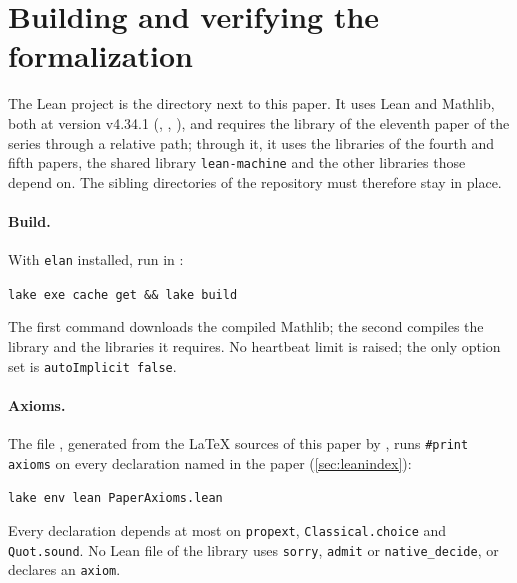 \section{Building and verifying the formalization}\label{sec:verify}

The Lean project is the directory  next to this paper. It uses Lean and Mathlib, both at version v4.34.1
(, , ), and requires the library of the eleventh paper of
the series through a relative path; through it, it uses the libraries of the fourth and fifth papers, the shared
library \texttt{lean-machine} and the other libraries those depend on. The sibling directories of the repository must
therefore stay in place.

\paragraph{Build.} With \texttt{elan} installed, run in :
\begin{center}
\texttt{lake exe cache get \&\& lake build}
\end{center}
The first command downloads the compiled Mathlib; the second compiles the library and the libraries it requires. No
heartbeat limit is raised; the only option set is \texttt{autoImplicit false}.

\paragraph{Axioms.} The file , generated from the \LaTeX{} sources of this paper by
, runs \texttt{\#print axioms} on every declaration named in the paper (\cref{sec:leanindex}):
\begin{center}
\texttt{lake env lean PaperAxioms.lean}
\end{center}
Every declaration depends at most on \texttt{propext}, \texttt{Classical.choice} and \texttt{Quot.sound}. No Lean file of
the library uses \texttt{sorry}, \texttt{admit} or \texttt{native\_decide}, or declares an \texttt{axiom}.

